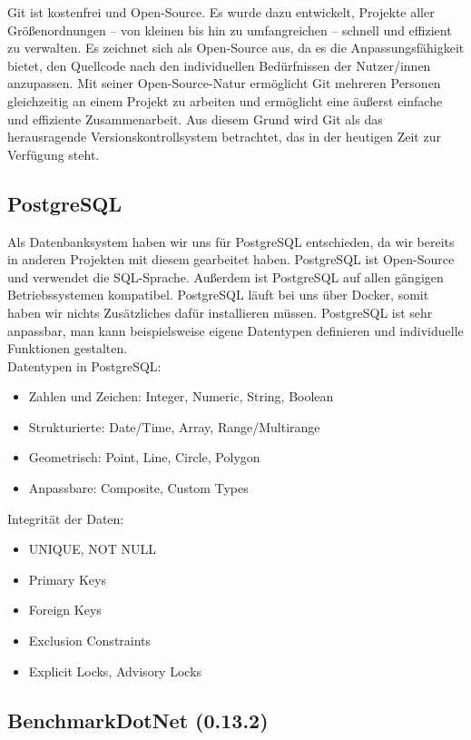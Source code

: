 Git ist kostenfrei und Open-Source. Es wurde dazu entwickelt, Projekte aller 
Größenordnungen – von kleinen bis hin zu umfangreichen – schnell und effizient zu verwalten. 
Es zeichnet sich als Open-Source aus, da es die Anpassungsfähigkeit bietet, den Quellcode 
nach den individuellen Bedürfnissen der Nutzer/innen anzupassen. 
Mit seiner Open-Source-Natur ermöglicht Git mehreren Personen gleichzeitig an einem 
Projekt zu arbeiten und ermöglicht eine äußerst einfache und effiziente Zusammenarbeit. 
Aus diesem Grund wird Git als das herausragende Versionskontrollsystem betrachtet, 
das in der heutigen Zeit zur Verfügung steht.
\newpage

\subsection*{PostgreSQL}

Als Datenbanksystem haben wir uns für PostgreSQL entschieden, da wir bereits in anderen 
Projekten mit diesem gearbeitet haben. PostgreSQL ist Open-Source und verwendet die SQL-Sprache. 
Außerdem ist PostgreSQL auf allen gängigen Betriebssystemen kompatibel.
PostgreSQL läuft bei uns über Docker, somit haben wir nichts Zusätzliches dafür installieren müssen.
PostgreSQL ist sehr anpassbar, man kann beispielsweise eigene Datentypen 
definieren und individuelle Funktionen gestalten.\\

Datentypen in PostgreSQL:
\begin{itemize}
    \item Zahlen und Zeichen: Integer, Numeric, String, Boolean
    \item Strukturierte: Date/Time, Array, Range/Multirange
    \item Geometrisch: Point, Line, Circle, Polygon
    \item Anpassbare: Composite, Custom Types
\end{itemize}

Integrität der Daten:
\begin{itemize}
    \item UNIQUE, NOT NULL
    \item Primary Keys
    \item Foreign Keys
    \item Exclusion Constraints
    \item Explicit Locks, Advisory Locks
\end{itemize}


\newpage
\subsection*{BenchmarkDotNet (0.13.2)}

